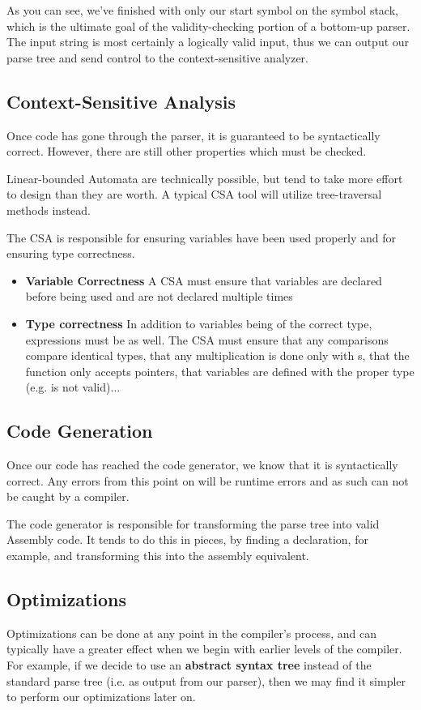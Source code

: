 \documentclass[12pt]{article}
\begin{document}
As you can see, we've finished with only our start symbol on the symbol stack, which is the ultimate goal of the validity-checking portion of a bottom-up parser. The input string is most certainly a logically valid input, thus we can output our parse tree and send control to the context-sensitive analyzer.

\subsection*{Context-Sensitive Analysis}
Once code has gone through the parser, it is guaranteed to be syntactically correct. However, there are still other properties which must be checked.

Linear-bounded Automata are technically possible, but tend to take more effort to design than they are worth. A typical CSA tool will utilize tree-traversal methods instead.

The CSA is responsible for ensuring variables have been used properly and for ensuring type correctness.
\begin{itemize}
\item {\bf Variable Correctness} A CSA must ensure that variables are declared before being used and are not declared multiple times
\item {\bf Type correctness} In addition to variables being of the correct type, expressions must be as well. The CSA must ensure that any comparisons compare identical types, that any multiplication is done only with s, that the  function only accepts pointers, that variables are defined with the proper type (e.g.  is not valid)...
\end{itemize}

\subsection*{Code Generation}
Once our code has reached the code generator, we know that it is syntactically correct. Any errors from this point on will be runtime errors and as such can not be caught by a compiler.

The code generator is responsible for transforming the parse tree into valid Assembly code. It tends to do this in pieces, by finding a declaration, for example, and transforming this into the assembly equivalent.

\subsection*{Optimizations}
Optimizations can be done at any point in the compiler's process, and can typically have a greater effect when we begin with earlier levels of the compiler. For example, if we decide to use an {\bf abstract syntax tree} instead of the standard parse tree (i.e. as output from our parser), then we may find it simpler to perform our optimizations later on.
\end{document}

